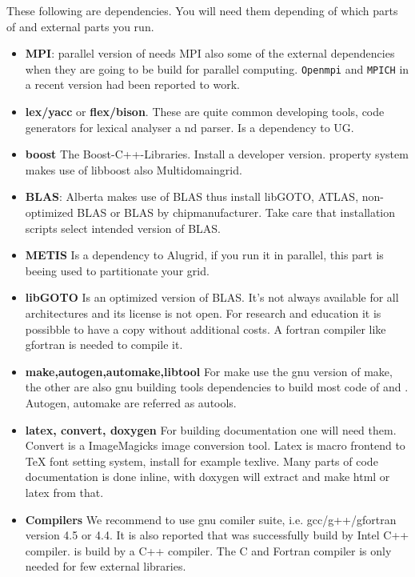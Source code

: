 These following are dependencies. You will need them depending of which parts of \Dune and external parts you run.
\begin{itemize}
\item \textbf{MPI}: parallel version of \Dune needs MPI also some of the external dependencies when they are going to be build for parallel computing. \texttt{Openmpi} and \texttt{MPICH} in a recent version had been reported to work. 

\item \textbf{lex/yacc} or \textbf{flex/bison}. These are quite common developing tools, code generators for lexical analyser a nd parser.  Is a dependency to UG.

\item \textbf{boost} The Boost-C++-Libraries. Install a developer version. \Dumux property system makes use of libboost also \Dune Multidomaingrid.

\item \textbf{BLAS}: Alberta makes use of BLAS thus install libGOTO, ATLAS, non-optimized BLAS or BLAS by chipmanufacturer. Take care that installation scripts select intended version of BLAS. 

\item \textbf{METIS} Is a dependency to Alugrid, if you run it in parallel, this part is beeing used to partitionate your grid.

\item \textbf{libGOTO} Is an optimized version of BLAS. It's not always available for all architectures and 
its license is not open. For research and education it is possibble to have a copy without additional costs.
A fortran compiler like gfortran is needed to compile it.

\item \textbf{make,autogen,automake,libtool} 
For make use the gnu version of make, the other are also gnu building tools dependencies to build most code of \Dune and \Dumux. Autogen, automake are referred as autools. 

\item \textbf{latex, convert, doxygen} For building \Dumux documentation one will need them. 
Convert is a ImageMagicks image conversion tool. Latex is macro frontend to TeX font setting system, install for example texlive.  Many parts of code documentation is done inline, with doxygen will extract and make html or latex 
from that.

\item \textbf{Compilers} We recommend to use gnu comiler suite, i.e. gcc/g++/gfortran version 4.5 or 4.4. It is also reported that \Dune was successfully build by Intel C++ compiler. \Dune is build by a C++ compiler. The C and Fortran compiler is only needed for few external libraries.


\end{itemize}

